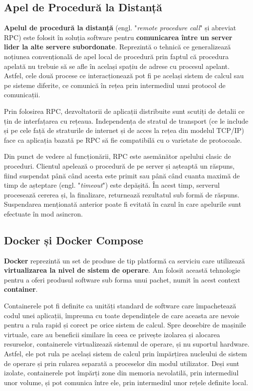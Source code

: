 \documentclass[../../main.tex]{subfiles}
\begin{document}
\subsection{Apel de Procedură la Distanță}

\textbf{Apelul de procedură la distanță} (engl. "\textit{remote procedure call}" și abreviat RPC) este folosit în soluția software pentru \textbf{comunicarea între un server lider la alte servere subordonate}. Reprezintă o tehnică ce generalizează noțiunea convențională de apel local de procedură prin faptul că procedura apelată nu trebuie să se afle în același spațiu de adrese cu procesul apelant. Astfel, cele două procese ce interacționează pot fi pe același sistem de calcul sau pe sisteme diferite, ce comunică în rețea prin intermediul unui protocol de comunicații.

Prin folosirea RPC, dezvoltatorii de aplicații distribuite sunt scutiți de detalii ce țin de interfațarea cu rețeaua. Independența de stratul de transport (ce le include și pe cele față de straturile de internet și de acces la rețea din modelul TCP/IP) face ca aplicația bazată pe RPC să fie compatibilă cu o varietate de protocoale.

Din punct de vedere al funcționării, RPC este asemănător apelului clasic de proceduri. Clientul apelează o procedură de pe server și așteaptă un răspuns, fiind suspendat până când acesta este primit sau până când cuanta maximă de timp de așteptare (engl. "\textit{timeout}") este depășită. În acest timp, serverul procesează cererea și, la finalizare, returnează rezultatul sub formă de răspuns. Suspendarea menționată anterior poate fi evitată în cazul în care apelurile sunt efectuate în mod asincron.

\subsection{Docker și Docker Compose}

\textbf{Docker} reprezintă un set de produse de tip platformă ca serviciu care utilizează \textbf{virtualizarea la nivel de sistem de operare}. Am folosit această tehnologie pentru a oferi produsul software sub forma unui pachet, numit în acest context \textbf{container}.

Containerele pot fi definite ca unități standard de software care împachetează codul unei aplicații, împreuna cu toate dependințele de care aceasta are nevoie pentru a rula rapid și corect pe orice sistem de calcul. Spre deosebire de mașinile virtuale, care au beneficii similare în ceea ce privește izolarea și alocarea resurselor, containerele virtualizează sistemul de operare, și nu suportul hardware. Astfel, ele pot rula pe același sistem de calcul prin împărțirea nucleului de sistem de operare și prin rularea separată a proceselor din modul utilizator. Deși sunt izolate, containerele pot împărți zone din memoria nevolatilă, prin intermediul unor volume, și pot comunica între ele, prin intermediul unor rețele definite local.
\end{document}
